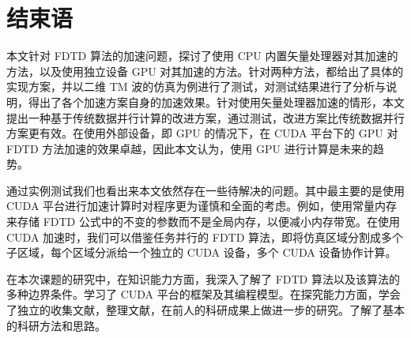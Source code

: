 
\chapter{结束语}

本文针对 FDTD 算法的加速问题，探讨了使用 CPU 内置矢量处理器对其加速的方法，以及使用独立设备 GPU 对其加速的方法。针对两种方法，都给出了具体的实现方案，并以二维 TM 波的仿真为例进行了测试，对测试结果进行了分析与说明，得出了各个加速方案自身的加速效果。针对使用矢量处理器加速的情形，本文提出一种基于传统数据并行计算的改进方案，通过测试，改进方案比传统数据并行方案更有效。在使用外部设备，即 GPU 的情况下，在 CUDA 平台下的 GPU 对 FDTD 方法加速的效果卓越，因此本文认为，使用 GPU 进行计算是未来的趋势。

通过实例测试我们也看出来本文依然存在一些待解决的问题。其中最主要的是使用 CUDA 平台进行加速计算时对程序更为谨慎和全面的考虑。例如，使用常量内存来存储 FDTD 公式中的不变的参数而不是全局内存，以便减小内存带宽。在使用 CUDA 加速时，我们可以借鉴任务并行的 FDTD 算法，即将仿真区域分割成多个子区域，每个区域分派给一个独立的 CUDA 设备，多个 CUDA 设备协作计算。

在本次课题的研究中，在知识能力方面，我深入了解了 FDTD 算法以及该算法的多种边界条件。学习了 CUDA 平台的框架及其编程模型。在探究能力方面，学会了独立的收集文献，整理文献，在前人的科研成果上做进一步的研究。了解了基本的科研方法和思路。
